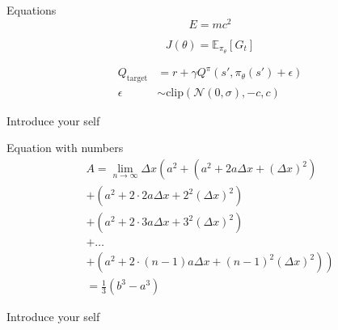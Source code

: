 \documentclass[aspectratio=169]{beamer}
\begin{document}
        \begin{frame}{Equations}
            \begin{equation*}
                E = mc^2
            \end{equation*}

            \begin{equation}
                J(\theta) = \mathbb{E}_{\pi_\theta}[G_t]
            \end{equation}

            \begin{align}
                Q_{\mathrm{target}} &= r + \gamma Q^\pi(s', \pi_\theta(s') + \epsilon)\\
                \epsilon &\sim \mathrm{clip}(\mathcal{N}(0, \sigma), -c, c)
            \end{align}

            \begin{note}
                {Introduce your self}
            \end{note}
        \end{frame}

        \begin{frame}{Equation with numbers}
            \begin{multline}
                A=\lim_{n\rightarrow\infty}\Delta x\left(a^{2}+\left(a^{2}+2a\Delta x+\left(\Delta x\right)^{2}\right)\right. \\
                +\left(a^{2}+2\cdot2a\Delta x+2^{2}\left(\Delta x\right)^{2}\right) \\
                +\left(a^{2}+2\cdot3a\Delta x+3^{2}\left(\Delta x\right)^{2}\right) \\
                +\ldots \\
                \left.+\left(a^{2}+2\cdot(n-1)a\Delta x+(n-1)^{2}\left(\Delta x\right)^{2}\right)\right) \\
                =\frac{1}{3}\left(b^{3}-a^{3}\right)
            \end{multline}

            \begin{note}
                {Introduce your self}
            \end{note}
        \end{frame}
\end{document}
